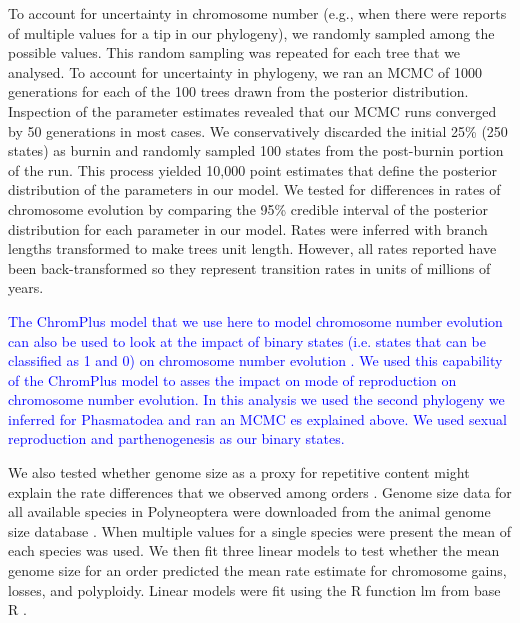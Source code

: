 \documentclass[]{rsos}%
\begin{document}
To account for uncertainty in chromosome number (e.g., when there were reports of multiple values for a tip in our phylogeny), we randomly sampled among the possible values.
This random sampling was repeated for each tree that we analysed.
To account for uncertainty in phylogeny, we ran an MCMC of 1000 generations for each of the 100 trees drawn from the posterior distribution.
Inspection of the parameter estimates revealed that our MCMC runs converged by 50 generations in most cases.  
We conservatively discarded the initial 25\% (250 states) as burnin and randomly sampled 100 states from the post-burnin portion of the run. 
This process yielded 10,000 point estimates that define the posterior distribution of the parameters in our model.
We tested for differences in rates of chromosome evolution by comparing the 95\% credible interval of the posterior distribution for each parameter in our model.
Rates were inferred with branch lengths transformed to make trees unit length.
However, all rates reported have been back-transformed so they represent transition rates in units of millions of years.

\textcolor{blue}{The ChromPlus model that we use here to model chromosome number evolution can also be used to look at the impact of binary states (i.e. states that can be classified as 1 and 0) on chromosome number evolution \cite{blackmon2019meiotic}. We used this capability of the ChromPlus model to asses the impact on mode of reproduction on chromosome number evolution. In this analysis we used the second phylogeny we inferred for Phasmatodea and ran an MCMC es explained above. We used sexual reproduction and parthenogenesis as our binary states.}

We also tested whether genome size as a proxy for repetitive content might explain the rate differences that we observed among orders \cite{kidwell2002transposable,bennetzen2005mechanisms}.
Genome size data for all available species in Polyneoptera were downloaded from the animal genome size database \cite{gregory2019}.
When multiple values for a single species were present the mean of each species was used.
We then fit three linear models to test whether the mean genome size for an order predicted the mean rate estimate for chromosome gains, losses, and polyploidy. 
Linear models were fit using the R function lm from base R \cite{R-citation}.
\end{document}
